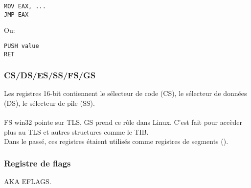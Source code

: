\begin{lstlisting}
MOV EAX, ...
JMP EAX
\end{lstlisting}

Ou:

\begin{lstlisting}
PUSH value
RET
\end{lstlisting}

\subsubsection{CS/DS/ES/SS/FS/GS}

Les registres 16-bit contiennent le sélecteur de code (CS), le sélecteur de données
(DS), le sélecteur de pile (SS).\\
\\
FS \InENRU win32 pointe sur \ac{TLS}, GS prend ce rôle dans Linux.
C'est fait pour accèder plus au \ac{TLS} et autres structures comme le \ac{TIB}.
\\
Dans le passé, ces registres étaient utilisés comme registres de segments ().

\subsubsection{Registre de flags}
\label{EFLAGS}
\ac{AKA} EFLAGS.

